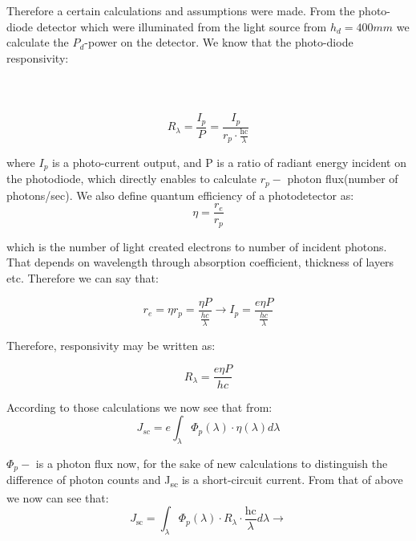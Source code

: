 \noindent Therefore a certain calculations and assumptions were made. From the
photo-diode detector which were illuminated from the light source from
\(h_{d} = 400mm\) we calculate the \(P_{d}\)-power on the detector. We know that the photo-diode responsivity: \\ \\ \\ \\ 

\begin{equation}
R_{\lambda} = \frac{I_{p}}{P} = \frac{I_{p}}{r_{p} \cdot \frac{\text{hc}}{\lambda}}
\end{equation}


\noindent where \(I_{p}\) is a photo-current output, and P is a ratio of radiant
energy incident on the photodiode, which directly enables to calculate
\(r_{p} -\) photon flux(number of photons/sec). We also define quantum
efficiency of a photodetector as:
\begin{equation}
\eta = \frac{r_{e}}{r_{p}}
\end{equation}


\noindent which is the number of light created electrons to number of incident
photons. That depends on wavelength through absorption coefficient,
thickness of layers etc. Therefore we can say that:

\begin{equation}
r_{e} = \eta r_{p} = \frac{\eta P}{\frac{hc}{\lambda}} \rightarrow I_{p} = \frac{e\eta P}{\frac{hc}{\lambda}}
\end{equation}


\noindent Therefore, responsivity may be written as:

\begin{equation}
R_{\lambda} = \frac{e\eta P}{hc}
\end{equation}


\noindent According to those calculations we now see that from:
\begin{equation}
J_{sc} = e\int_{\lambda}^{}{\Phi_{p}(\lambda ) \cdot \eta (\lambda) d \lambda }
\end{equation}

\noindent \(\Phi_{p} -\) is a photon flux now, for the sake of new calculations to
distinguish the difference of photon counts and J­\textsubscript{sc} is
a short-circuit current. From that of above we now can see that:
\begin{equation}
J_{\text{sc}} = \int_{\lambda}^{}{\Phi_{p}\left( \lambda \right) \cdot R_{\lambda } \cdot \frac{\text{hc}}{\lambda }d\lambda } \rightarrow
\end{equation}

